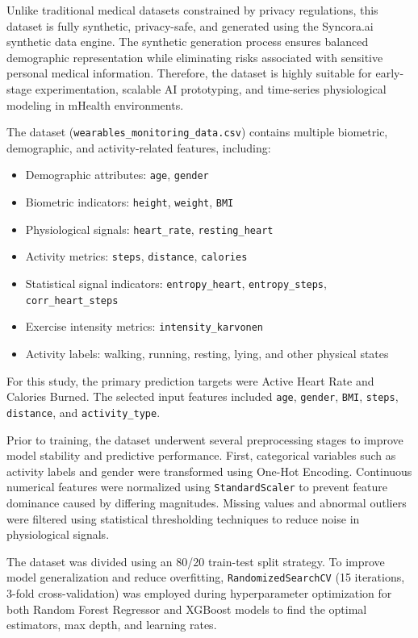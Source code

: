 \documentclass[journal, a4paper]{IEEEtran}
\begin{document}
Unlike traditional medical datasets constrained by privacy regulations, this dataset is fully synthetic, privacy-safe, and generated using the Syncora.ai synthetic data engine. The synthetic generation process ensures balanced demographic representation while eliminating risks associated with sensitive personal medical information. Therefore, the dataset is highly suitable for early-stage experimentation, scalable AI prototyping, and time-series physiological modeling in mHealth environments.

The dataset (\texttt{wearables\_monitoring\_data.csv}) contains multiple biometric, demographic, and activity-related features, including:
\begin{itemize}
    \item Demographic attributes: \texttt{age}, \texttt{gender}
    \item Biometric indicators: \texttt{height}, \texttt{weight}, \texttt{BMI}
    \item Physiological signals: \texttt{heart\_rate}, \texttt{resting\_heart}
    \item Activity metrics: \texttt{steps}, \texttt{distance}, \texttt{calories}
    \item Statistical signal indicators: \texttt{entropy\_heart}, \texttt{entropy\_steps}, \texttt{corr\_heart\_steps}
    \item Exercise intensity metrics: \texttt{intensity\_karvonen}
    \item Activity labels: walking, running, resting, lying, and other physical states
\end{itemize}

For this study, the primary prediction targets were Active Heart Rate and Calories Burned. The selected input features included \texttt{age}, \texttt{gender}, \texttt{BMI}, \texttt{steps}, \texttt{distance}, and \texttt{activity\_type}.

Prior to training, the dataset underwent several preprocessing stages to improve model stability and predictive performance. First, categorical variables such as activity labels and gender were transformed using One-Hot Encoding. Continuous numerical features were normalized using \texttt{StandardScaler} to prevent feature dominance caused by differing magnitudes. Missing values and abnormal outliers were filtered using statistical thresholding techniques to reduce noise in physiological signals.

The dataset was divided using an 80/20 train-test split strategy. To improve model generalization and reduce overfitting, \texttt{RandomizedSearchCV} (15 iterations, 3-fold cross-validation) was employed during hyperparameter optimization for both Random Forest Regressor and XGBoost models to find the optimal estimators, max depth, and learning rates.
\end{document}
